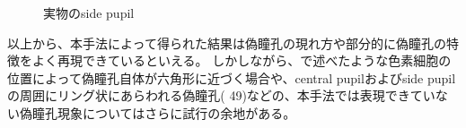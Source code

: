 \begin{figure}[htbp]
  \centering
{}
  \caption{実物のside pupil}
  \label{FCrazyBird}
\end{figure}

以上から、本手法によって得られた結果は偽瞳孔の現れ方や部分的に偽瞳孔の特徴をよく再現できているといえる。
しかしながら、で述べたような色素細胞の位置によって偽瞳孔自体が六角形に近づく場合や、central pupilおよびside pupilの周囲にリング状にあらわれる偽瞳孔( 49)などの、本手法では表現できていない偽瞳孔現象についてはさらに試行の余地がある。

